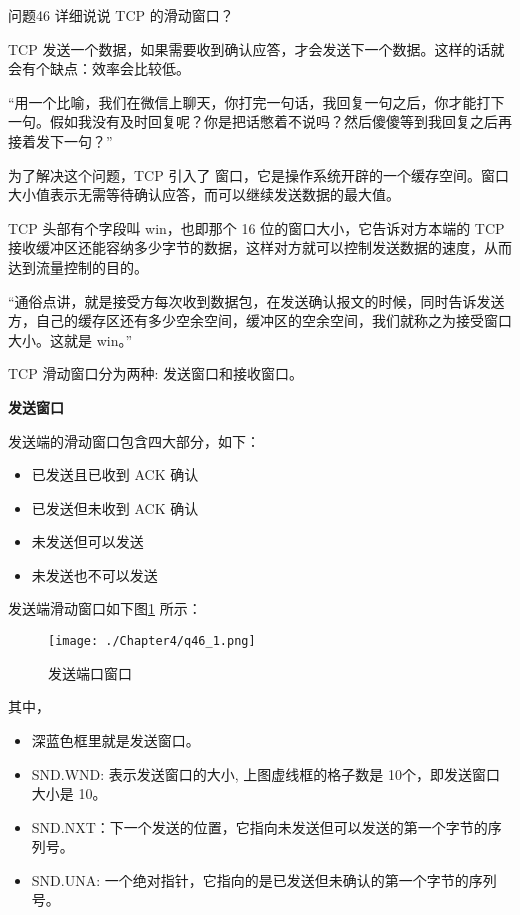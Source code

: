 \documentclass[cn,11pt,color=blue,lang=cn]{elegantbook}
\begin{document}
\begin{custom}{问题46}
详细说说 TCP 的滑动窗口？
\end{custom}
\begin{solution}
TCP 发送一个数据，如果需要收到确认应答，才会发送下一个数据。这样的话就会有个缺点：效率会比较低。

“用一个比喻，我们在微信上聊天，你打完一句话，我回复一句之后，你才能打下一句。假如我没有及时回复呢？你是把话憋着不说吗？然后傻傻等到我回复之后再接着发下一句？”

为了解决这个问题，TCP 引入了 窗口，它是操作系统开辟的一个缓存空间。窗口大小值表示无需等待确认应答，而可以继续发送数据的最大值。

TCP 头部有个字段叫 win，也即那个 16 位的窗口大小，它告诉对方本端的 TCP 接收缓冲区还能容纳多少字节的数据，这样对方就可以控制发送数据的速度，从而达到流量控制的目的。

“通俗点讲，就是接受方每次收到数据包，在发送确认报文的时候，同时告诉发送方，自己的缓存区还有多少空余空间，缓冲区的空余空间，我们就称之为接受窗口大小。这就是 win。”

TCP 滑动窗口分为两种: 发送窗口和接收窗口。

\begin{note} \textbf{发送窗口} \end{note}
发送端的滑动窗口包含四大部分，如下：
\begin{itemize}
	\item 已发送且已收到 ACK 确认
	\item 已发送但未收到 ACK 确认
	\item 未发送但可以发送
	\item 未发送也不可以发送
\end{itemize}

发送端滑动窗口如下图\ref{fig46_1} 所示：

\begin{figure}[htbp]
\centering
\texttt{[image: ./Chapter4/q46\_1.png]}
\caption{发送端口窗口}
\label{fig46_1}
\end{figure}
其中，

\begin{itemize}
	\item 深蓝色框里就是发送窗口。
	\item SND.WND: 表示发送窗口的大小, 上图虚线框的格子数是 10个，即发送窗口大小是 10。
	\item SND.NXT：下一个发送的位置，它指向未发送但可以发送的第一个字节的序列号。
	\item SND.UNA: 一个绝对指针，它指向的是已发送但未确认的第一个字节的序列号。
\end{itemize}


\end{solution}
\end{document}
